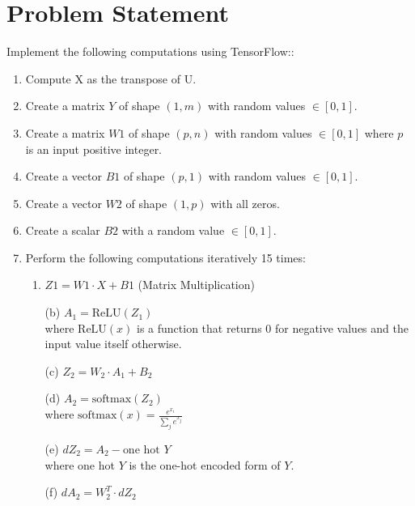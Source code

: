 
\section*{Problem Statement}
\large
 Implement the following computations using TensorFlow:: 

\begin{enumerate}
   \item Compute X as the transpose of U.
      \item Create a matrix $Y$ of shape $(1, m)$ with random values $\in [0, 1]$.
    \item Create a matrix $W1$ of shape $(p, n)$ with random values $\in [0, 1]$ where $p$ is an input positive integer.
    \item Create a vector $B1$ of shape $(p, 1)$ with random values $\in [0, 1]$.
    \item Create a vector $W2$ of shape $(1, p)$ with all zeros.
    \item Create a scalar $B2$ with a random value $\in [0, 1]$.
    \item Perform the following computations iteratively 15 times:
   \begin{enumerate}
        \item $Z1 = W1 \cdot X + B1$ \hspace{0.2cm} (Matrix Multiplication)
       \item[(b)] \( A_1 = \text{ReLU}(Z_1) \) \\
  where \( \text{ReLU}(x) \) is a function that returns 0 for negative values and the input value itself otherwise.

    \item[(c)] \( Z_2 = W_2 \cdot A_1 + B_2 \)

    \item[(d)] \( A_2 = \text{softmax}(Z_2) \) \\
  where \( \text{softmax}(x) = \frac{e^{x_i}}{\sum_j e^{x_j}} \)

    \item[(e)] \( dZ_2 = A_2 - \text{one hot } Y \) \\
  where one hot \( Y \) is the one-hot encoded form of \( Y \).

    \item[(f)] \( dA_2 = W_2^T \cdot dZ_2 \)


\end{enumerate}
\end{enumerate}
